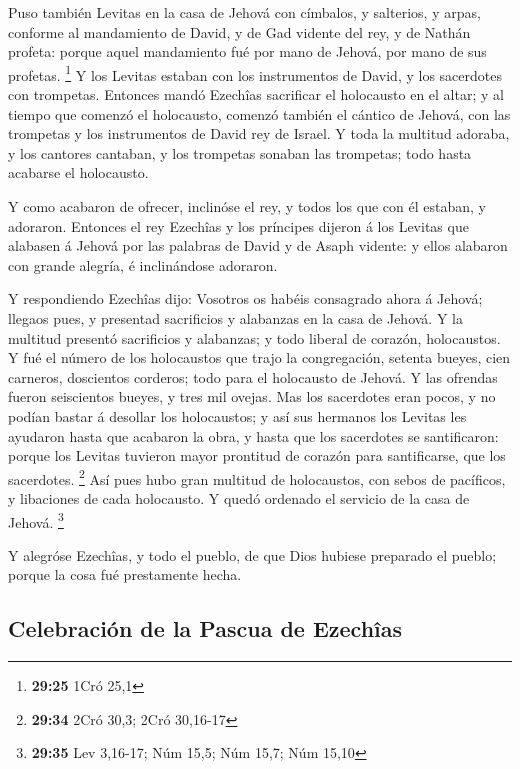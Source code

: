  Puso también Levitas en la casa de Jehová con címbalos, y
salterios, y arpas, conforme al mandamiento de David, y de Gad vidente
del rey, y de Nathán profeta: porque aquel mandamiento fué por mano de
Jehová, por mano de sus profetas. \footnote{\textbf{29:25} 1Cró 25,1}
 Y los Levitas estaban con los instrumentos de David, y los
sacerdotes con trompetas.  Entonces mandó Ezechîas
sacrificar el holocausto en el altar; y al tiempo que comenzó el
holocausto, comenzó también el cántico de Jehová, con las trompetas y
los instrumentos de David rey de Israel.  Y toda la
multitud adoraba, y los cantores cantaban, y los trompetas sonaban las
trompetas; todo hasta acabarse el holocausto.

 Y como acabaron de ofrecer, inclinóse el rey, y todos los
que con él estaban, y adoraron.  Entonces el rey Ezechîas y
los príncipes dijeron á los Levitas que alabasen á Jehová por las
palabras de David y de Asaph vidente: y ellos alabaron con grande
alegría, é inclinándose adoraron.

 Y respondiendo Ezechîas dijo: Vosotros os habéis
consagrado ahora á Jehová; llegaos pues, y presentad sacrificios y
alabanzas en la casa de Jehová. Y la multitud presentó sacrificios y
alabanzas; y todo liberal de corazón, holocaustos.  Y fué
el número de los holocaustos que trajo la congregación, setenta bueyes,
cien carneros, doscientos corderos; todo para el holocausto de Jehová.
 Y las ofrendas fueron seiscientos bueyes, y tres mil
ovejas.  Mas los sacerdotes eran pocos, y no podían bastar
á desollar los holocaustos; y así sus hermanos los Levitas les ayudaron
hasta que acabaron la obra, y hasta que los sacerdotes se santificaron:
porque los Levitas tuvieron mayor prontitud de corazón para
santificarse, que los sacerdotes. \footnote{\textbf{29:34} 2Cró 30,3;
  2Cró 30,16-17}  Así pues hubo gran multitud de
holocaustos, con sebos de pacíficos, y libaciones de cada holocausto. Y
quedó ordenado el servicio de la casa de Jehová. \footnote{\textbf{29:35}
  Lev 3,16-17; Núm 15,5; Núm 15,7; Núm 15,10}

 Y alegróse Ezechîas, y todo el pueblo, de que Dios hubiese
preparado el pueblo; porque la cosa fué prestamente hecha.

\hypertarget{celebraciuxf3n-de-la-pascua-de-ezechuxeeas}{%
\subsection{Celebración de la Pascua de
Ezechîas}\label{celebraciuxf3n-de-la-pascua-de-ezechuxeeas}}


